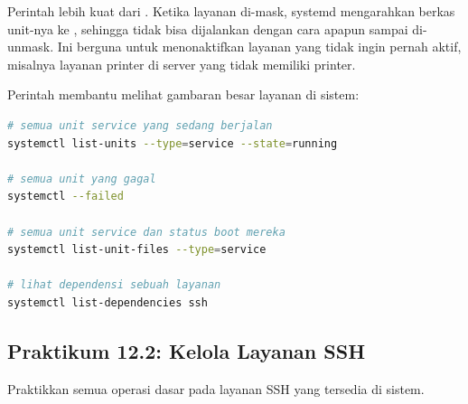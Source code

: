 Perintah  lebih kuat dari . Ketika layanan di-mask, systemd mengarahkan berkas unit-nya ke , sehingga tidak bisa dijalankan dengan cara apapun sampai di-unmask. Ini berguna untuk menonaktifkan layanan yang tidak ingin pernah aktif, misalnya layanan printer di server yang tidak memiliki printer.

Perintah  membantu melihat gambaran besar layanan di sistem:

\begin{lstlisting}[language=bash, caption={Melihat dan memfilter daftar unit}]
# semua unit service yang sedang berjalan
systemctl list-units --type=service --state=running

# semua unit yang gagal
systemctl --failed

# semua unit service dan status boot mereka
systemctl list-unit-files --type=service

# lihat dependensi sebuah layanan
systemctl list-dependencies ssh
\end{lstlisting}

\subsection*{Praktikum 12.2: Kelola Layanan SSH}

Praktikkan semua operasi dasar  pada layanan SSH yang tersedia di sistem.

